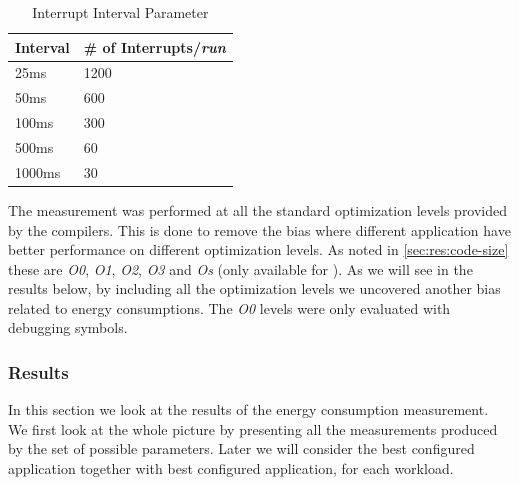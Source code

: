\begin{table}[H]
  \centering
  \begin{tabular}{l|l}
    \textbf{Interval} & \textbf{\# of Interrupts/\emph{run}} \\
    \hline
    25ms & 1200 \\
    50ms & 600 \\
    100ms & 300 \\
    500ms & 60 \\
    1000ms & 30 \\
    \hline
  \end{tabular}
  \caption{Interrupt Interval Parameter}
  \label{tab:}
\end{table}

The measurement was performed at all the standard optimization levels provided by the compilers.
This is done to remove the bias where different application have better performance on different optimization levels.
As noted in \autoref{sec:res:code-size} these are \emph{O0}, \emph{O1}, \emph{O2}, \emph{O3} and \emph{Os} (only available for {\C}).
As we will see in the results below, by including all the optimization levels we uncovered another bias related to energy consumptions.
The \emph{O0} levels were only evaluated with debugging symbols.

\subsubsection{Results}

In this section we look at the results of the energy consumption measurement.
We first look at the whole picture by presenting all the measurements produced by the set of possible parameters.
Later we will consider the best configured {\C} application together with best configured {\rust} application, for each workload.

